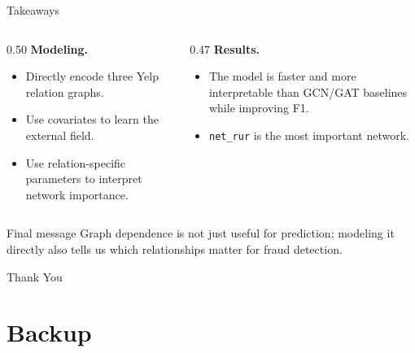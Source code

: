 \documentclass[10pt]{beamer}
\begin{document}
\begin{frame}{Takeaways}
\begin{columns}[T]
\begin{column}{0.50\textwidth}
\textbf{Modeling.}
\begin{itemize}
    \item Directly encode three Yelp relation graphs.
    \item Use covariates to learn the external field.
    \item Use relation-specific parameters to interpret network importance.
\end{itemize}
\end{column}
\begin{column}{0.47\textwidth}
\textbf{Results.}
\begin{itemize}
    \item The model is faster and more interpretable than GCN/GAT baselines while improving F1.
    \item \texttt{net\_rur} is the most important network.
\end{itemize}
\end{column}
\end{columns}

\vspace{0.8em}
\begin{alertblock}{Final message}
Graph dependence is not just useful for prediction; modeling it directly also tells us which relationships matter for fraud detection.
\end{alertblock}
\end{frame}

\begin{frame}[plain]
    \centering
    \vfill
    {\Large Thank You}
    \vfill
\end{frame}

\appendix
\section{Backup}
\end{document}

